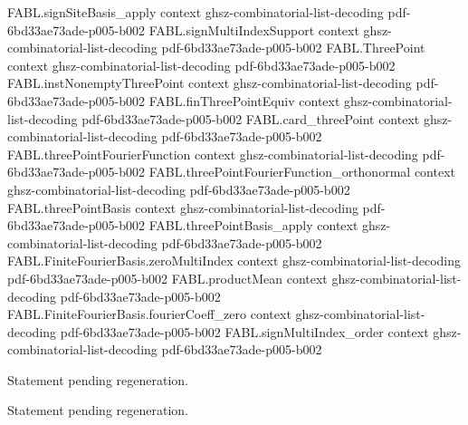 \begin{theorem}
  {FABL.signSiteBasis_apply}
  {context}
  {ghsz-combinatorial-list-decoding}
  {pdf-6bd33ae73ade-p005-b002}
\proofstep
  {FABL.signMultiIndexSupport}
  {context}
  {ghsz-combinatorial-list-decoding}
  {pdf-6bd33ae73ade-p005-b002}
\proofstep
  {FABL.ThreePoint}
  {context}
  {ghsz-combinatorial-list-decoding}
  {pdf-6bd33ae73ade-p005-b002}
\proofstep
  {FABL.instNonemptyThreePoint}
  {context}
  {ghsz-combinatorial-list-decoding}
  {pdf-6bd33ae73ade-p005-b002}
\proofstep
  {FABL.finThreePointEquiv}
  {context}
  {ghsz-combinatorial-list-decoding}
  {pdf-6bd33ae73ade-p005-b002}
\proofstep
  {FABL.card_threePoint}
  {context}
  {ghsz-combinatorial-list-decoding}
  {pdf-6bd33ae73ade-p005-b002}
\proofstep
  {FABL.threePointFourierFunction}
  {context}
  {ghsz-combinatorial-list-decoding}
  {pdf-6bd33ae73ade-p005-b002}
\proofstep
  {FABL.threePointFourierFunction_orthonormal}
  {context}
  {ghsz-combinatorial-list-decoding}
  {pdf-6bd33ae73ade-p005-b002}
\proofstep
  {FABL.threePointBasis}
  {context}
  {ghsz-combinatorial-list-decoding}
  {pdf-6bd33ae73ade-p005-b002}
\proofstep
  {FABL.threePointBasis_apply}
  {context}
  {ghsz-combinatorial-list-decoding}
  {pdf-6bd33ae73ade-p005-b002}
\proofstep
  {FABL.FiniteFourierBasis.zeroMultiIndex}
  {context}
  {ghsz-combinatorial-list-decoding}
  {pdf-6bd33ae73ade-p005-b002}
\proofstep
  {FABL.productMean}
  {context}
  {ghsz-combinatorial-list-decoding}
  {pdf-6bd33ae73ade-p005-b002}
\proofstep
  {FABL.FiniteFourierBasis.fourierCoeff_zero}
  {context}
  {ghsz-combinatorial-list-decoding}
  {pdf-6bd33ae73ade-p005-b002}
\proofstep
  {FABL.signMultiIndex_order}
  {context}
  {ghsz-combinatorial-list-decoding}
  {pdf-6bd33ae73ade-p005-b002}

Statement pending regeneration.
\end{theorem}

\begin{theorem}
\label{FABL.FiniteFourierBasis.fourierCoeff_const}
\leanok
{}
Statement pending regeneration.
\end{theorem}

